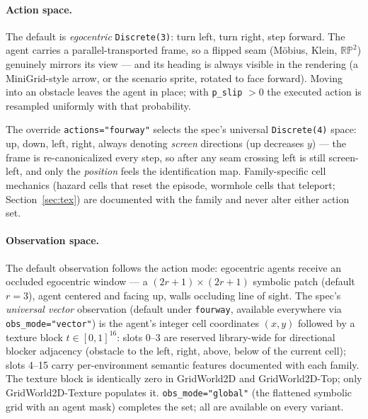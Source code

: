 \documentclass[11pt]{article}
\begin{document}
\paragraph{Action space.} The default is \emph{egocentric}
\texttt{Discrete(3)}: turn left, turn right, step forward. The agent
carries a parallel-transported frame, so a flipped seam (M\"obius,
Klein, $\mathbb{RP}^2$) genuinely mirrors its view --- and its heading is
always visible in the rendering (a MiniGrid-style arrow, or the
scenario sprite, rotated to face forward). Moving into an obstacle
leaves the agent in place; with \texttt{p\_slip} $> 0$ the executed
action is resampled uniformly with that probability.

The override \texttt{actions="fourway"} selects the spec's universal
\texttt{Discrete(4)} space: up, down, left, right, always denoting
\emph{screen} directions (up decreases $y$) --- the frame is
re-canonicalized every step, so after any seam crossing left is still
screen-left, and only the \emph{position} feels the identification
map. Family-specific cell mechanics (hazard cells that reset the
episode, wormhole cells that teleport; Section~\ref{sec:tex}) are
documented with the family and never alter either action set.

\paragraph{Observation space.} The default observation follows the
action mode: egocentric agents receive an occluded egocentric window
--- a $(2r{+}1) \times (2r{+}1)$ symbolic patch (default $r = 3$),
agent centered and facing up, walls occluding line of sight. The
spec's \emph{universal vector} observation (default under
\texttt{fourway}, available everywhere via
\texttt{obs\_mode="vector"}) is the agent's integer cell
coordinates $(x, y)$ followed by a texture block
$t \in [0, 1]^{16}$: slots 0--3 are reserved library-wide for
directional blocker adjacency (obstacle to the left, right, above,
below of the current cell); slots 4--15 carry per-environment
semantic features documented with each family. The texture block is
identically zero in GridWorld2D and GridWorld2D-Top; only
GridWorld2D-Texture populates it. \texttt{obs\_mode="global"} (the
flattened symbolic grid with an agent mask) completes the set; all
are available on every variant.
\end{document}
